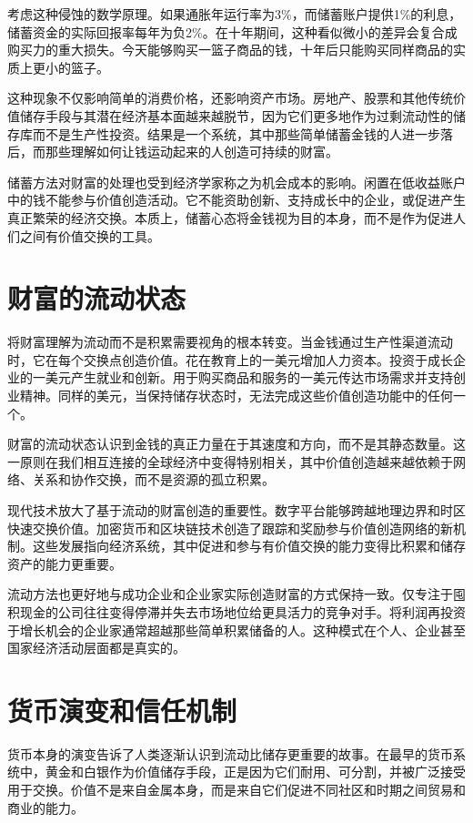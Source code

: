 \documentclass[
  Letterpaper,
]{scrbook}
\begin{document}
考虑这种侵蚀的数学原理。如果通胀年运行率为3\%，而储蓄账户提供1\%的利息，储蓄资金的实际回报率每年为负2\%。在十年期间，这种看似微小的差异会复合成购买力的重大损失。今天能够购买一篮子商品的钱，十年后只能购买同样商品的实质上更小的篮子。

这种现象不仅影响简单的消费价格，还影响资产市场。房地产、股票和其他传统价值储存手段与其潜在经济基本面越来越脱节，因为它们更多地作为过剩流动性的储存库而不是生产性投资。结果是一个系统，其中那些简单储蓄金钱的人进一步落后，而那些理解如何让钱运动起来的人创造可持续的财富。

储蓄方法对财富的处理也受到经济学家称之为机会成本的影响。闲置在低收益账户中的钱不能参与价值创造活动。它不能资助创新、支持成长中的企业，或促进产生真正繁荣的经济交换。本质上，储蓄心态将金钱视为目的本身，而不是作为促进人们之间有价值交换的工具。

\section{财富的流动状态}\label{ux8d22ux5bccux7684ux6d41ux52a8ux72b6ux6001}

将财富理解为流动而不是积累需要视角的根本转变。当金钱通过生产性渠道流动时，它在每个交换点创造价值。花在教育上的一美元增加人力资本。投资于成长企业的一美元产生就业和创新。用于购买商品和服务的一美元传达市场需求并支持创业精神。同样的美元，当保持储存状态时，无法完成这些价值创造功能中的任何一个。

财富的流动状态认识到金钱的真正力量在于其速度和方向，而不是其静态数量。这一原则在我们相互连接的全球经济中变得特别相关，其中价值创造越来越依赖于网络、关系和协作交换，而不是资源的孤立积累。

现代技术放大了基于流动的财富创造的重要性。数字平台能够跨越地理边界和时区快速交换价值。加密货币和区块链技术创造了跟踪和奖励参与价值创造网络的新机制。这些发展指向经济系统，其中促进和参与有价值交换的能力变得比积累和储存资产的能力更重要。

流动方法也更好地与成功企业和企业家实际创造财富的方式保持一致。仅专注于囤积现金的公司往往变得停滞并失去市场地位给更具活力的竞争对手。将利润再投资于增长机会的企业家通常超越那些简单积累储备的人。这种模式在个人、企业甚至国家经济活动层面都是真实的。

\section{货币演变和信任机制}\label{ux8d27ux5e01ux6f14ux53d8ux548cux4fe1ux4efbux673aux5236}

货币本身的演变告诉了人类逐渐认识到流动比储存更重要的故事。在最早的货币系统中，黄金和白银作为价值储存手段，正是因为它们耐用、可分割，并被广泛接受用于交换。价值不是来自金属本身，而是来自它们促进不同社区和时期之间贸易和商业的能力。
\end{document}

